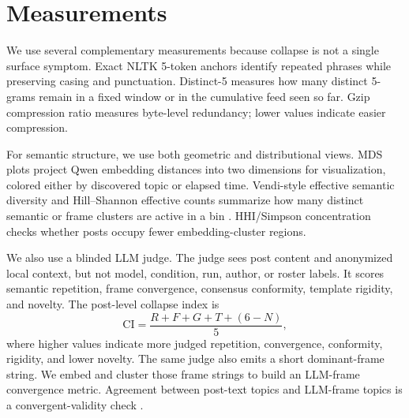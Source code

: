 \documentclass[11pt]{article}
\begin{document}
\begin{table}[t]
\centering
\small
{}
\caption{Run families used in the analysis. The canonical 48-run set is the main evidence base; secondary cohorts are reported as intervention probes.}
\label{tab:inventory}
\end{table}

\section{Measurements}

We use several complementary measurements because collapse is not a single surface symptom. Exact NLTK 5-token anchors identify repeated phrases while preserving casing and punctuation. Distinct-5 measures how many distinct 5-grams remain in a fixed window or in the cumulative feed seen so far. Gzip compression ratio measures byte-level redundancy; lower values indicate easier compression.

For semantic structure, we use both geometric and distributional views. MDS plots project Qwen embedding distances into two dimensions for visualization, colored either by discovered topic or elapsed time. Vendi-style effective semantic diversity and Hill--Shannon effective counts summarize how many distinct semantic or frame clusters are active in a bin \citep{shannon1948,hill1973,vendi2023}. HHI/Simpson concentration checks whether posts occupy fewer embedding-cluster regions.

We also use a blinded LLM judge. The judge sees post content and anonymized local context, but not model, condition, run, author, or roster labels. It scores semantic repetition, frame convergence, consensus conformity, template rigidity, and novelty. The post-level collapse index is
\begin{equation}
\mathrm{CI} = \frac{R + F + G + T + (6 - N)}{5},
\end{equation}
where higher values indicate more judged repetition, convergence, conformity, rigidity, and lower novelty. The same judge also emits a short dominant-frame string. We embed and cluster those frame strings to build an LLM-frame convergence metric. Agreement between post-text topics and LLM-frame topics is a convergent-validity check \citep{campbell1959}.
\end{document}
